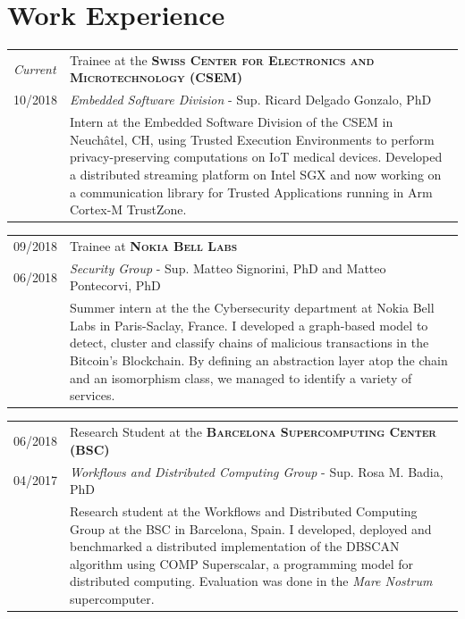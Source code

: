 \documentclass[a4paper,10pt]{article} %
\begin{document}
\section{Work Experience}
%
\begin{tabular}{R{1.5cm}|p{13.8cm}}
    \emph{Current} & Trainee at the \textbf{\textsc{Swiss Center for Electronics and Microtechnology} (CSEM)} \\
    \textsc{10/2018} & \small{\emph{Embedded Software Division} - Sup. Ricard Delgado Gonzalo, PhD }\\ 
& \footnotesize{Intern at the Embedded Software Division of the CSEM in Neuch\^atel, CH, using Trusted Execution Environments to perform privacy-preserving computations on IoT medical devices. Developed a distributed streaming platform on Intel SGX and now working on a communication library for Trusted Applications running in Arm Cortex-M TrustZone.}
\end{tabular}

\begin{tabular}{R{1.5cm}|p{13.8cm}}
    \textsc{09/2018} & Trainee at \textbf{\textsc{Nokia Bell Labs}} \\
    \textsc{06/2018} & \small{\emph{Security Group} - Sup. Matteo Signorini, PhD and Matteo Pontecorvi, PhD}\\ 
& \footnotesize{Summer intern at the the Cybersecurity department at Nokia Bell Labs in Paris-Saclay, France. I developed a graph-based model to detect, cluster and classify chains of malicious transactions in the Bitcoin's Blockchain. By defining an abstraction layer atop the chain and an isomorphism class, we managed to identify a variety of services.}
\end{tabular}

\begin{tabular}{R{1.5cm}|p{13.8cm}}
    \textsc{06/2018} & Research Student at the \textbf{\textsc{Barcelona Supercomputing Center} (BSC)} \\
    \textsc{04/2017} & \small{\emph{Workflows and Distributed Computing Group} - Sup. Rosa M. Badia, PhD} \\ 
    & \footnotesize{Research student at the Workflows and Distributed Computing Group at the BSC in Barcelona, Spain. I developed, deployed and benchmarked a distributed implementation of the DBSCAN algorithm using COMP Superscalar, a programming model for distributed computing. Evaluation was done in the \textit{Mare Nostrum} supercomputer.}
\end{tabular}
\end{document}
